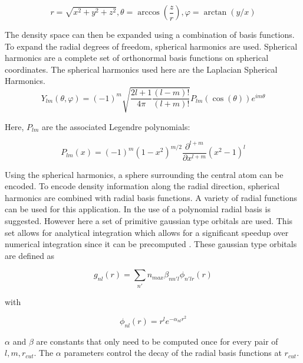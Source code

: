 $$
r = \sqrt{x^2 + y^2 + z^2}
,
\theta = \arccos(\frac{z}{r})
,
\varphi = \arctan(y / x)
$$ %

The density space can then be expanded using a combination of basis functions.
To expand the radial degrees of freedom, spherical harmonics are used.
Spherical harmonics are a complete set of orthonormal basis functions on spherical coordinates.
The spherical harmonics used here are the Laplacian Spherical Harmonics.
$$
Y_{lm}(\theta, \varphi) = (-1)^m \sqrt{\frac{2l + 1}{4 \pi} \frac{(l - m)!}{(l + m)!}} P_{lm}\left(\cos(\theta) \right) e^{im\theta}
$$

Here, $P_{lm}$ are the associated Legendre polynomials:

$$
P_{lm}(x) = (-1)^m (1-x^2)^{m/2} \frac{\partial^{l+m}}{\partial x^{l+m}}(x^2 - 1)^l
$$ %



Using the spherical harmonics, a sphere surrounding the central atom can be encoded.
To encode density information along the radial direction, spherical harmonics are combined with radial basis functions.
A variety of radial functions can be used for this application.
In \cite{KUHL1982236} the use of a polynomial radial basis is suggested.
However here a set of primitive gaussian type orbitals are used.
This set allows for analytical integration which allows for a significant speedup over numerical integration since it can be precomputed \cite{dscribe}.
These gaussian type orbitals are defined as

$$g_{nl}(r) = \sum_{n'}{n_{max}} \beta_{nn'l} \phi_{n'lr}(r) $$

with 

$$\phi_{nl}(r) = r^l e^{-\alpha_{nl}r^2} $$ %



$\alpha$ and $\beta$ are constants that only need to be computed once for every pair of $l,m, r_{cut}$.
The $\alpha$ parameters control the decay of the radial basis functions at $r_{cut}$.


